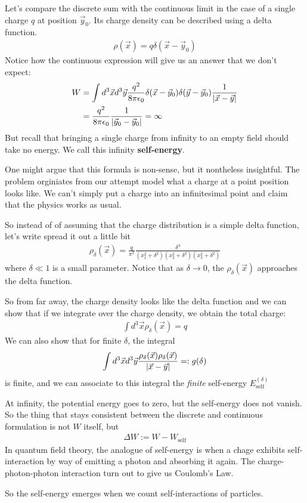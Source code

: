 Let's compare the discrete sum with the continuous limit in the case of a single charge $q$ at position $\vec{y}_0$.
Its charge density can be described using a delta function.
\begin{align*}
  \rho(\vec{x}) = q \delta(\vec{x} - \vec{y}_0)
\end{align*}
Notice how the continuous expression will give us an answer that we don't expect:
\begin{align*}
  W &= \int d^{3}\vec{x}d^{3}\vec{y} \frac{q^{2}}{8 \pi \epsilon_0} \delta(\vec{x} - \vec{y}_0) \delta(\vec{y} - \vec{y}_0) \frac{1}{\vert\vec{x} - \vec{y}\vert}\\
  &= \frac{q^{2}}{8 \pi \epsilon_0} \frac{1}{\vert\vec{y}_0 - \vec{y}_0\vert} = \infty
\end{align*}
But recall that bringing a single charge from infinity to an empty field should take no energy.
We call this infinity \textbf{self-energy}.

One might argue that this formula is non-sense, but it nontheless insightful.
The problem orginiates from our attempt model what a charge at a point position looks like.
We can't simply put a charge into an infinitesimal point and claim that the physics works as usual.

So instead of of assuming that the charge distribution is a simple delta function, let's write spread it out a little bit
\begin{align*}
  \rho_{\delta}(\vec{x}) = \frac{q}{\pi^{3}} \frac{\delta^{3}}{(x_1^{2} + \delta^{2})(x_2^{2}+\delta^{2})(x_3^{2} + \delta^{2})}
\end{align*}
where $\delta \ll 1$ is a small parameter.
Notice that as $\delta \to 0$, the $\rho_{\delta}(\vec{x})$ approaches the delta function.

So from far away, the charge density looks like the delta function and we can show that if we integrate over the charge density, we obtain the total charge:
\begin{align*}
  \int d^{3} \vec{x} \rho_{\delta}(\vec{x}) = q
\end{align*}
We can also show that for finite $\delta$, the integral
\begin{align*}
  \int d^{3} \vec{x} d^{3} \vec{y} \frac{\rho_{\delta}(\vec{x}) \rho_{\delta}(\vec{x})}{\vert\vec{x} - \vec{y}\vert} =: g(\delta)
\end{align*}
is finite, and we can associate to this integral the \emph{finite} self-energy $E_{\text{self}}^{(\delta)}$


At infinity, the potential energy goes to zero, but the self-energy does not vanish.
So the thing that stays consistent between the discrete and continuous formulation is not $W$ itself, but
\begin{align*}
  \Delta W := W - W_{\text{self}}
\end{align*}
In quantum field theory, the analogue of self-energy is when a chage exhibits self-interaction by way of emitting a photon and absorbing it again.
The charge-photon-photon interaction turn out to give us Coulomb's Law.


So the self-energy emerges when we count self-interactions of particles.
